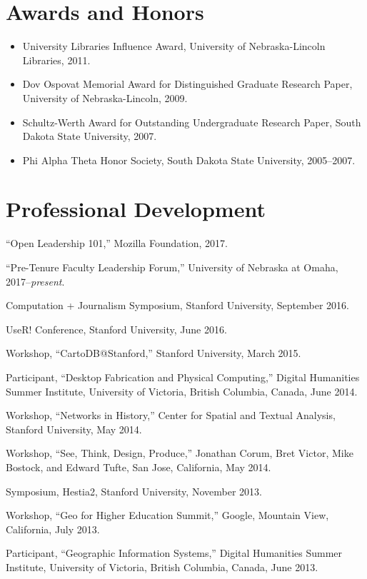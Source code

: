 \section{Awards and Honors}\label{awards-and-honors}

\begin{itemize}
\tightlist
\item
  University Libraries Influence Award, University of Nebraska-Lincoln
  Libraries, 2011.
\item
  Dov Ospovat Memorial Award for Distinguished Graduate Research Paper,
  University of Nebraska-Lincoln, 2009.
\item
  Schultz-Werth Award for Outstanding Undergraduate Research Paper,
  South Dakota State University, 2007.
\item
  Phi Alpha Theta Honor Society, South Dakota State University,
  2005--2007.
\end{itemize}

\section{Professional Development}\label{professional-development}

``Open Leadership 101,'' Mozilla Foundation, 2017.

``Pre-Tenure Faculty Leadership Forum,'' University of Nebraska at
Omaha, 2017--\emph{present}.

Computation + Journalism Symposium, Stanford University, September 2016.

UseR! Conference, Stanford University, June 2016.

Workshop, ``CartoDB@Stanford,'' Stanford University, March 2015.

Participant, ``Desktop Fabrication and Physical Computing,'' Digital
Humanities Summer Institute, University of Victoria, British Columbia,
Canada, June 2014.

Workshop, ``Networks in History,'' Center for Spatial and Textual
Analysis, Stanford University, May 2014.

Workshop, ``See, Think, Design, Produce,'' Jonathan Corum, Bret Victor,
Mike Bostock, and Edward Tufte, San Jose, California, May 2014.

Symposium, Hestia2, Stanford University, November 2013.

Workshop, ``Geo for Higher Education Summit,'' Google, Mountain View,
California, July 2013.

Participant, ``Geographic Information Systems,'' Digital Humanities
Summer Institute, University of Victoria, British Columbia, Canada, June
2013.

